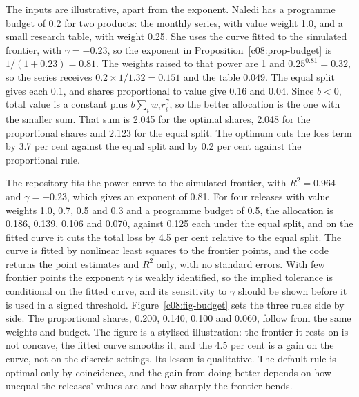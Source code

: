 \begin{example}\label{c08:ex-two}
The inputs are illustrative, apart from the exponent. Naledi has a programme budget of
0.2 for two products: the monthly series, with value weight 1.0, and a small research
table, with weight 0.25. She uses the curve fitted to the simulated frontier, with
$\gamma = -0.23$, so the exponent in Proposition~\ref{c08:prop-budget} is
$1/(1 + 0.23) = 0.81$. The weights raised to that power are 1 and $0.25^{0.81} = 0.32$,
so the series receives $0.2 \times 1/1.32 = 0.151$ and the table 0.049. The equal split
gives each 0.1, and shares proportional to value give 0.16 and 0.04. Since $b < 0$,
total value is a constant plus $b \sum_i w_i r_i^{\gamma}$, so the better allocation is the
one with the smaller sum.
That sum is 2.045 for the optimal shares, 2.048 for the proportional shares and 2.123
for the equal split. The optimum cuts the loss term by 3.7 per cent against the equal
split and by 0.2 per cent against the proportional rule.
\end{example}


The repository fits the power curve to the simulated frontier, with $R^2 = 0.964$
and $\gamma = -0.23$, which gives an exponent of 0.81. For four releases with value
weights 1.0, 0.7, 0.5 and 0.3 and a programme budget of 0.5, the allocation is
0.186, 0.139, 0.106 and 0.070, against 0.125 each under the equal split, and on the
fitted curve it cuts the total loss by 4.5 per cent relative to the equal split.
The curve is fitted by nonlinear least squares to the frontier points, and the code returns the point estimates and $R^2$ only, with no standard errors. With few frontier points the exponent $\gamma$ is weakly identified, so the implied tolerance is conditional on the fitted curve, and its sensitivity to $\gamma$ should be shown before it is used in a signed threshold.
Figure~\ref{c08:fig-budget} sets the three rules side by side. The proportional
shares, 0.200, 0.140, 0.100 and 0.060, follow from the same weights and budget.
The figure is a stylised illustration: the frontier it rests on is not concave, the
fitted curve smooths it, and the 4.5 per cent is a gain on the curve, not on the
discrete settings. Its lesson is qualitative. The default rule is optimal only by
coincidence, and the gain from doing better depends on how unequal the releases'
values are and how sharply the frontier bends.

